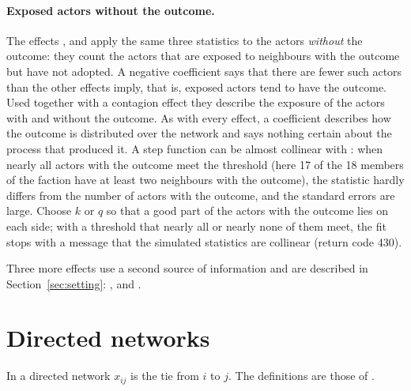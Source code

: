 \paragraph{Exposed actors without the outcome.} The effects ,  and  apply the same three statistics to the actors \emph{without} the outcome: they count the actors that are exposed to neighbours with the outcome but have not adopted. A negative coefficient says that there are fewer such actors than the other effects imply, that is, exposed actors tend to have the outcome. Used together with a contagion effect they describe the exposure of the actors with and without the outcome. As with every effect, a coefficient describes how the outcome is distributed over the network and says nothing certain about the process that produced it.
A step function can be almost collinear with : when nearly all actors with the outcome meet the threshold (here 17 of the 18 members of the faction have at least two neighbours with the outcome), the statistic hardly differs from the number of actors with the outcome, and the standard errors are large. Choose $k$ or $q$ so that a good part of the actors with the outcome lies on each side; with a threshold that nearly all or nearly none of them meet, the fit stops with a message that the simulated statistics are collinear (return code 430).

Three more effects use a second source of information and are described in Section~\ref{sec:setting}: ,  and .

\section{Directed networks}\label{sec:eff-directed}

In a directed network $x_{ij}$ is the tie from $i$ to $j$. The definitions are those of \alaamee{}.

